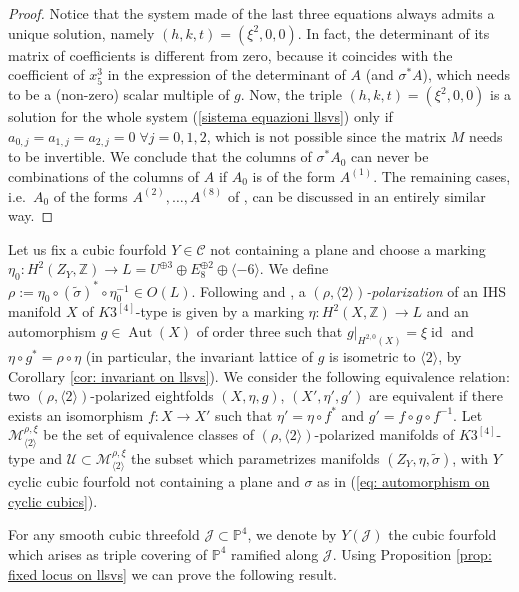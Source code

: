 \documentclass{amsart}
\theoremstyle{definition}
\newcommand{\ra}{\rightarrow}
\newcommand{\IZ}{\mathbb{Z}}
\newcommand{\coloneqq}{:=}
\newcommand{\hskq}{K3^{\left[4\right]}}
\DeclareMathOperator{\id}{id}
\DeclareMathOperator{\aut}{Aut}
\begin{document}
\begin{proof}
Notice that the system made of the last three equations always admits a unique solution, namely $(h,k,t) = (\xi^2, 0,0)$. In fact, the determinant of its matrix of coefficients is different from zero, because it coincides with the coefficient of $x_5^3$ in the expression of the determinant of $A$ (and $\sigma^* A$), which needs to be a (non-zero) scalar multiple of $g$. Now, the triple $(h,k,t) = (\xi^2, 0,0)$ is a solution for the whole system (\ref{sistema equazioni llsvs}) only if $a_{0,j} = a_{1,j} = a_{2,j} = 0 \; \forall j=0,1,2$, which is not possible since the matrix $M$ needs to be invertible. We conclude that the columns of $\sigma^* A_0$ can never be combinations of the columns of $A$ if $A_0$ is of the form $A^{(1)}$. The remaining cases, i.e.\ $A_0$ of the forms $A^{(2)},\dots, A^{(8)}$  of \cite[\S 1]{llsvs}, can be discussed in an entirely similar way.
\end{proof}

Let us fix a cubic fourfold $Y \in \mathcal{C}$ not containing a plane and choose a marking $\eta_0^{}: H^2(Z_Y, \IZ) \ra L = U^{\oplus 3} \oplus E_8^{\oplus 2} \oplus \langle -6 \rangle$. We define $\rho \coloneqq \eta_0^{} \circ \left( \tilde{\sigma} \right)^* \circ \eta_0^{-1} \in O(L)$. Following \cite{bcs_ballq} and \cite{bcs_cubic}, a \emph{$(\rho, \langle 2 \rangle)$-polarization} of an IHS manifold $X$ of $\hskq$-type is given by a marking $\eta: H^2(X, \IZ) \ra L$ and an automorphism $g \in \aut(X)$ of order three such that $g\vert_{H^{2,0}(X)} = \xi \id$ and $\eta \circ g^* = \rho \circ \eta$ (in particular, the invariant lattice of $g$ is isometric to $\langle 2 \rangle$, by Corollary \ref{cor: invariant on llsvs}). We consider the following equivalence relation: two $(\rho, \langle 2 \rangle)$-polarized eightfolds $(X, \eta, g)$, $(X', \eta', g')$ are equivalent if there exists an isomorphism $f: X \ra X'$ such that $\eta' = \eta \circ f^*$ and $g' = f \circ g \circ f^{-1}$. Let $\mathcal{M}^{\rho, \xi}_{\langle 2 \rangle}$ be the set of equivalence classes of $(\rho, \langle 2 \rangle)$-polarized manifolds of $\hskq$-type and $\mathcal{U} \subset \mathcal{M}^{\rho, \xi}_{\langle 2 \rangle}$ the subset which parametrizes manifolds $(Z_Y, \eta, \tilde{\sigma})$, with $Y$ cyclic cubic fourfold not containing a plane and $\sigma$ as in (\ref{eq: automorphism on cyclic cubics}).

For any smooth cubic threefold $\mathcal{J} \subset \mathbb{P}^4$, we denote by $Y(\mathcal{J})$ the cubic fourfold which arises as triple covering of $\mathbb{P}^4$ ramified along $\mathcal{J}$. Using Proposition \ref{prop: fixed locus on llsvs} we can prove the following result.
\end{document}
